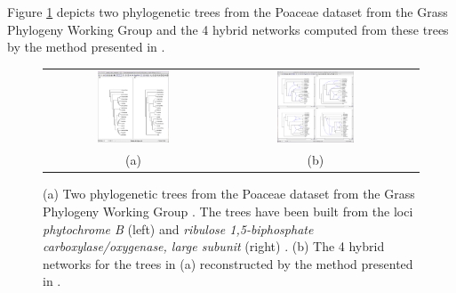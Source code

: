 \documentclass[11pt]{article}
\begin{document}


Figure \ref{figure:hybridNet} depicts two phylogenetic trees from the 
Poaceae dataset from the Grass Phylogeny Working Group \cite{gpwg2001} and the 4  hybrid networks computed from these trees by the method presented in \cite{Albrecht2012}.


\begin{figure}[ht] %
\begin{center}
\begin{tabular}{ccc}
\includegraphics[width=0.42\textwidth]{./figs/phyB_rbcL.pdf}&
\includegraphics[width=0.45\textwidth]{./figs/phyB_rbcL-hybrid.pdf}\vspace{0.3cm}\\
(a)&(b)
\end{tabular}
\end{center}	
\caption{\small \sffamily 
(a) Two phylogenetic trees from the 
Poaceae dataset from the Grass Phylogeny Working Group \cite{gpwg2001}. The trees have been built from the loci 
{\em phytochrome B} (left) 
and {\em ribulose 1,5-biphosphate carboxylase/oxygenase, large subunit} (right) \cite{Schmidt2003}. (b) The 4  hybrid networks for the trees in (a) reconstructed  by the method presented in \cite{Albrecht2012}.
}
\label{figure:hybridNet}
\end{figure}
\end{document}

